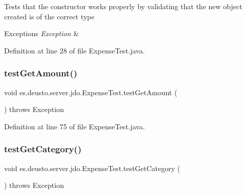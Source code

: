 Tests that the constructor works properly by validating that the new object created is of the correct type 
\begin{DoxyExceptions}{Exceptions}
{\em Exception} & \\
\hline
\end{DoxyExceptions}


Definition at line 28 of file Expense\+Test.\+java.

\mbox{\label{classes_1_1deusto_1_1server_1_1jdo_1_1_expense_test_a18a3c76cb6200e9cbeb2f88a41f7a39c}} 
\subsubsection{\texorpdfstring{test\+Get\+Amount()}{testGetAmount()}}
{\footnotesize\ttfamily void es.\+deusto.\+server.\+jdo.\+Expense\+Test.\+test\+Get\+Amount (\begin{DoxyParamCaption}{ }\end{DoxyParamCaption}) throws Exception}



Definition at line 75 of file Expense\+Test.\+java.

\mbox{\label{classes_1_1deusto_1_1server_1_1jdo_1_1_expense_test_a137a49175ad33ab63b53a6c4d1fc56ae}} 
\subsubsection{\texorpdfstring{test\+Get\+Category()}{testGetCategory()}}
{\footnotesize\ttfamily void es.\+deusto.\+server.\+jdo.\+Expense\+Test.\+test\+Get\+Category (\begin{DoxyParamCaption}{ }\end{DoxyParamCaption}) throws Exception}



